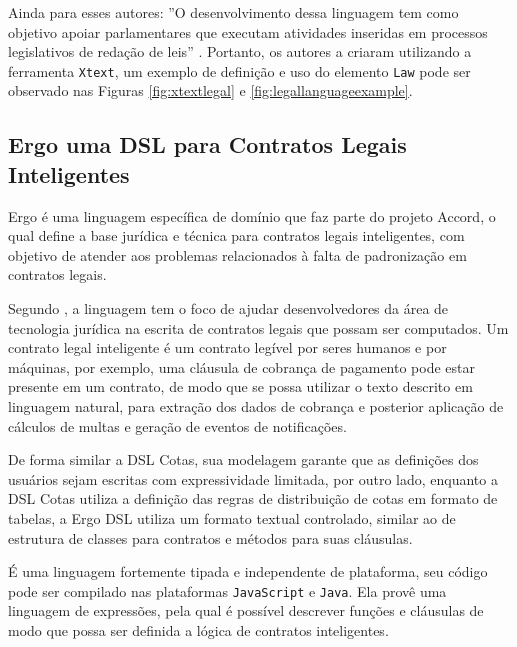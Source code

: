 \newpage
Ainda para esses autores: ''O desenvolvimento dessa linguagem tem como objetivo apoiar parlamentares que executam atividades inseridas em processos legislativos de redação de leis''  \cite[p. 45, tradução nossa]{legallanguage}. Portanto, os autores a criaram utilizando a ferramenta \texttt{Xtext}, um exemplo de definição e uso do elemento \texttt{Law} pode ser observado nas Figuras \ref{fig:xtextlegal} e \ref{fig:legallanguageexample}.








\newpage
\subsection{Ergo uma DSL para Contratos Legais Inteligentes}
\label{ergo}

Ergo é uma linguagem específica de domínio que faz parte do projeto Accord, o qual define a base jurídica e técnica para contratos legais inteligentes, com objetivo de atender aos problemas relacionados à falta de padronização em contratos legais. 

Segundo , a linguagem tem o foco de ajudar desenvolvedores da área de tecnologia jurídica na escrita de contratos legais que possam ser computados. Um contrato legal inteligente é um contrato legível por seres humanos e por máquinas, por exemplo, uma cláusula de cobrança de pagamento pode estar presente em um contrato, de modo que se possa utilizar o texto descrito em linguagem natural, para extração dos dados de cobrança e posterior aplicação de cálculos de multas e geração de eventos de notificações. 

De forma similar a DSL Cotas, sua modelagem garante que as definições dos usuários sejam escritas com expressividade limitada, por outro lado, enquanto a DSL Cotas utiliza a definição das regras de distribuição de cotas em formato de tabelas, a Ergo DSL utiliza um formato textual controlado, similar ao de estrutura de classes para contratos e métodos para suas cláusulas.

É uma linguagem fortemente tipada e independente de plataforma, seu código pode ser compilado nas plataformas \texttt{JavaScript} e \texttt{Java}. Ela provê uma linguagem de expressões, pela qual é possível descrever funções e cláusulas de modo que possa ser definida a lógica de contratos inteligentes.

